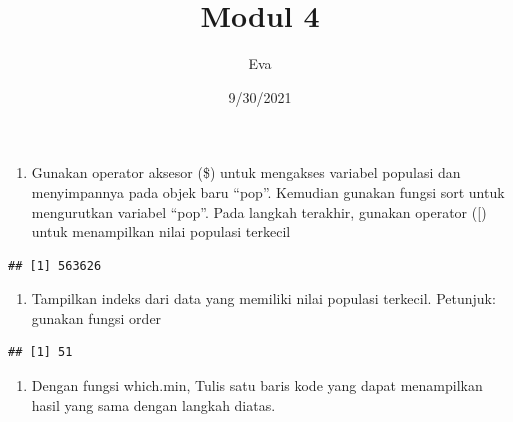 \documentclass[
]{article}
\title{Modul 4}
\author{Eva}
\date{9/30/2021}
\newenvironment{Shaded}{\begin{snugshade}}{\end{snugshade}}
\newcommand{\DecValTok}[1]{\textcolor[rgb]{0.00,0.00,0.81}{#1}}
\newcommand{\FunctionTok}[1]{\textcolor[rgb]{0.00,0.00,0.00}{#1}}
\newcommand{\NormalTok}[1]{#1}
\newcommand{\OtherTok}[1]{\textcolor[rgb]{0.56,0.35,0.01}{#1}}
\newcommand{\SpecialCharTok}[1]{\textcolor[rgb]{0.00,0.00,0.00}{#1}}
\providecommand{\tightlist}{%
  \setlength{\itemsep}{0pt}\setlength{\parskip}{0pt}}
\begin{document}
\maketitle

\begin{enumerate}
\def\labelenumi{\arabic{enumi}.}
\tightlist
\item
  Gunakan operator aksesor (\$) untuk mengakses variabel populasi dan
  menyimpannya pada objek baru ``pop''. Kemudian gunakan fungsi sort
  untuk mengurutkan variabel ``pop''. Pada langkah terakhir, gunakan
  operator ({[}) untuk menampilkan nilai populasi terkecil
\end{enumerate}

\begin{Shaded}
\end{Shaded}

\begin{verbatim}
## [1] 563626
\end{verbatim}

\begin{enumerate}
\def\labelenumi{\arabic{enumi}.}
\setcounter{enumi}{1}
\tightlist
\item
  Tampilkan indeks dari data yang memiliki nilai populasi terkecil.
  Petunjuk: gunakan fungsi order
\end{enumerate}

\begin{Shaded}
\end{Shaded}

\begin{verbatim}
## [1] 51
\end{verbatim}

\begin{enumerate}
\def\labelenumi{\arabic{enumi}.}
\setcounter{enumi}{2}
\tightlist
\item
  Dengan fungsi which.min, Tulis satu baris kode yang dapat menampilkan
  hasil yang sama dengan langkah diatas.
\end{enumerate}
\end{document}
